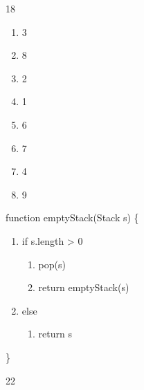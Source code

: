  

18


\begin{enumerate}
    \item 3
    \item 8
    \item 2
    \item 1
    \item 6
    \item 7
    \item 4
    \item 9
\end{enumerate}


function emptyStack(Stack s) \{
\begin{enumerate}
    \item if s.length > 0
    \begin{enumerate}
	\item pop(s)
	\item return emptyStack(s)
    \end{enumerate}
    \item else
    \begin{enumerate}
        \item return s
    \end{enumerate}
\end{enumerate}
\}


22




